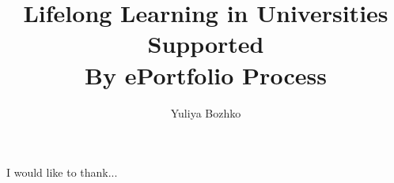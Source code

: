 \documentclass[11pt,PhD,twoside,openright]{muthesis}
\begin{document}



\title{Lifelong Learning in Universities Supported\\ 
  By ePortfolio Process}
\author{Yuliya Bozhko}

\beforeabstract

 


\newpage
\cleardoublepage
 
I would like to thank...

\newpage
\cleardoublepage

 

\newpage
\cleardoublepage

 

\newpage
\cleardoublepage
 
\tableofcontents
\newpage
\iftablespage
	\addvspace{10pt}
    \listoftables 
    \newpage
\fi
\iffigurespage
	\addvspace{10pt}
    \listoffigures
    \newpage
\fi

\afterpreface

\pagestyle{fancy}

\fancyhead{}
\fancyhead[LE,RO]{\slshape \leftmark}

\fancyfoot{} 
\fancyfoot[LE,RO]{\thepage} 
\renewcommand{\headrulewidth}{0.4pt}
\renewcommand{\footrulewidth}{0pt}


 


 
 
 
 
 

\cleardoublepage
{} 
{}
             

\appendix


\end{document}
